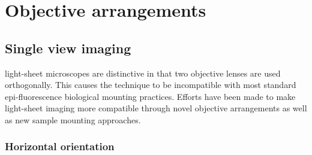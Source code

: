 
\section{Objective arrangements}
\subsection{Single view imaging}
\Gls{light-sheet} microscopes are distinctive in that two objective lenses are used orthogonally.
This causes the technique to be incompatible with most standard \gls{epi-fluorescence} biological mounting practices.
Efforts have been made to make \gls{light-sheet} imaging more compatible through novel objective arrangements as well as new sample mounting approaches.

\subsubsection{Horizontal orientation}


